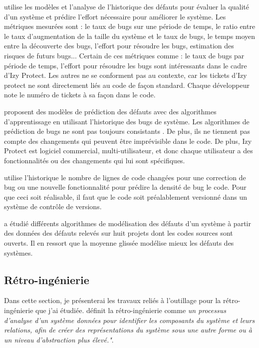 \documentclass[a4paper]{article}
\begin{document}
\citet{port17} utilise les modèles et l'analyse de l'historique des défauts pour évaluer la qualité d'un système et prédire l'effort nécessaire pour améliorer le système. Les métriques mesurées sont : le taux de bugs sur une période de temps, le ratio entre le taux d'augmentation de la taille du système et le taux de bugs, le temps moyen entre la découverte des bugs, l'effort pour résoudre les bugs, estimation des risques de futurs bugs...
Certain de ces métriques comme : le taux de bugs par période de temps, l'effort pour résoudre les bugs sont intéressants dans le cadre d'Izy Protect. 
Les autres ne se conforment pas au contexte, car les tickets d'Izy protect ne sont directement liés au code de façon standard.
Chaque développeur note le numéro de tickets à sa façon dans le code. 


\citet{kim07,Bibi06} proposent des modèles de prédiction des défauts avec des algorithmes d'apprentissage en utilisant l'historique des bugs de système. 
Les algorithmes de prédiction de bugs ne sont pas toujours consistants \cite{bang19}. De plus, ils ne tiennent pas compte des changements qui peuvent être imprévisible dans le code. 
De plus, Izy Protect est logiciel commercial, multi-utilisateur, et donc chaque utilisateur a des fonctionnalités ou des changements qui lui sont spécifiques. 

\citet{naga05} utilise l'historique le nombre de lignes de code changées pour une correction de  bug  ou une nouvelle fonctionnalité pour prédire la densité de bug le code.
 Pour que ceci soit réalisable, il faut que le code soit préalablement versionné dans un système de contrôle de versions.

\citet{Raja09} a étudié différents algorithmes de modélisation des défauts d'un système à partir des données des défauts relevés sur huit projets dont les codes sources sont ouverts. Il en ressort que la moyenne glissée modélise mieux les défauts des systèmes.

\subsection{Rétro-ingénierie}
\label{sec:retroingenierie}
Dans cette section, je présenterai les travaux reliés à l'outillage pour la rétro-ingénierie que j'ai étudiée.
\citet{Chik90a} définit la rétro-ingénierie comme \textit{un processus d'analyse d'un système données pour identifier les composants du système et leurs relations, afin de créer des représentations du système sous une autre forme ou à un niveau d'abstraction plus élevé."}.
\end{document}
